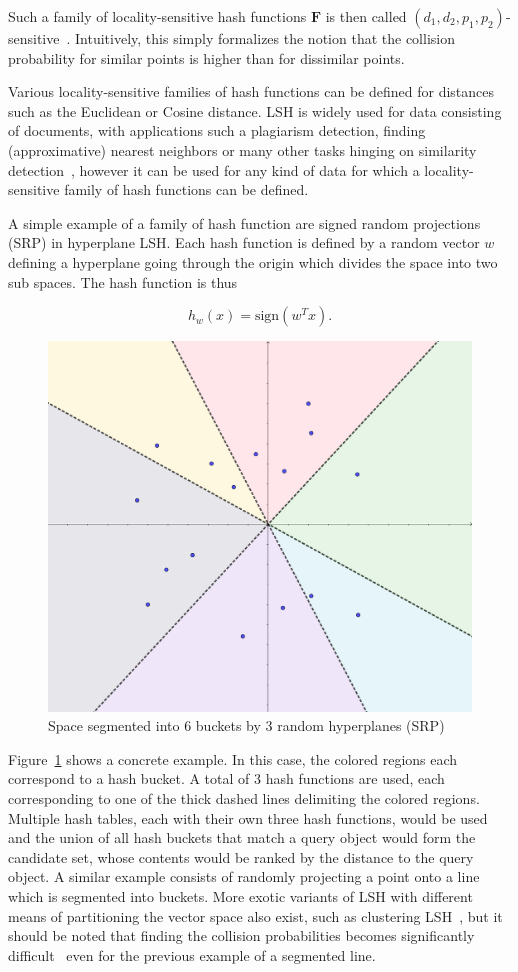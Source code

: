 Such a family of locality-sensitive hash functions $\mathbf{F}$ is then called
$(d_1, d_2, p_1, p_2)$-sensitive~\cite{mmds}.  Intuitively, this simply
formalizes the notion that the collision probability for similar points is
higher than for dissimilar points.

Various locality-sensitive families of hash
functions can be defined for distances such as the Euclidean or Cosine
distance. LSH is widely used for data consisting of documents, with
applications such a plagiarism detection, finding (approximative) nearest
neighbors or many other tasks hinging on similarity detection~\cite{mmds},
however it can be used for any kind of data for which a locality-sensitive
family of hash functions can be defined.

A simple example of a family of hash function are signed random projections
(SRP) in hyperplane LSH. Each hash function is defined by a random vector $w$
defining a hyperplane going through the origin which divides the space into two
sub spaces. The hash function is thus

\begin{equation}
  h_w(x) = \text{sign}(w^T x).
\end{equation}

\begin{figure}[tp]
  \centering
  \includegraphics[width=.6\textwidth]{img/srp}
  \caption{Space segmented into 6 buckets by 3 random hyperplanes (SRP)}
  \label{fig:srp}
\end{figure}

Figure~\ref{fig:srp} shows a concrete example. In this case, the colored
regions each correspond to a hash bucket. A total of 3 hash functions are used,
each corresponding to one of the thick dashed lines delimiting the colored regions. Multiple
hash tables, each with their own three hash functions, would be used and the
union of all hash buckets that match a query object would form the candidate
set, whose contents would be ranked by the distance to the query object. A
similar example consists of randomly projecting a point onto a line which is
segmented into buckets. More exotic variants of LSH with different means of
partitioning the vector space also exist, such as clustering
LSH~\cite{lshcomp}, but it should be noted that finding the collision
probabilities becomes significantly difficult~\cite{pstablelsh} even for the
previous example of a segmented line.

